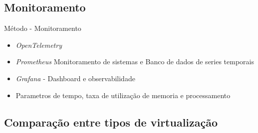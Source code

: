 \documentclass[10pt,brazil]{beamer}
\theoremstyle{definition}
\begin{document}
\subsection{Monitoramento}

\begin{frame}{Método - Monitoramento}
  \begin{itemize}
    \item \emph{OpenTelemetry}
    \item \emph{Prometheus} Monitoramento de sistemas e Banco de dados de series temporais
    \item \emph{Grafana} - Dashboard e observabilidade
    \item Parametros de tempo, taxa de utilização de memoria e processamento
  \end{itemize}
\end{frame}


\subsection{Comparação entre tipos de virtualização}
\end{document}
